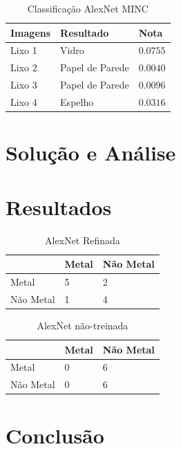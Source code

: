 \documentclass[conference, compsoc, 12pt]{IEEEtran}
\begin{document}
\begin{table}[]
\centering
\caption{Classificação AlexNet MINC}
\label{Tabela 1}
\begin{tabular}{|l|l|l|}
\hline
Imagens & Resultado & Nota \\ \hline
Lixo 1 & Vidro & $0.0755$ \\ \hline
Lixo 2 & Papel de Parede & $0.0040$ \\ \hline
Lixo 3 & Papel de Parede & $0.0096$\\ \hline
Lixo 4 & Espelho & $0.0316$ \\ \hline
\end{tabular}
\end{table}

\section{Solução e Análise}

\section{Resultados}

\begin{table}[]
\centering
\caption{AlexNet Refinada}
\label{my-label}
\begin{tabular}{|l|l|l|}
\hline
          & Metal & Não Metal \\ \hline
Metal     & 5     & 2         \\ \hline
Não Metal & 1     & 4         \\ \hline
\end{tabular}
\end{table}

\begin{table}[]
\centering
\caption{AlexNet não-treinada}
\label{my-label}
\begin{tabular}{|l|l|l|}
\hline
          & Metal & Não Metal \\ \hline
Metal     & 0     & 6         \\ \hline
Não Metal & 0     & 6         \\ \hline
\end{tabular}
\end{table}


\section{Conclusão}



\end{document}

